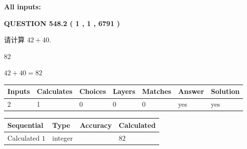 \documentclass{ctexart}
\begin{document}
   
   
   
\noindent{}
   
   
   
   
\noindent\vspace{0.1in}\hspace{-0.08in} {\textbf{\Large{All inputs: }}}
   
   
  
\vspace{0.2in}
  
{\textbf{\Large{QUESTION
548.2 
 ( 1 , 1 , 6791 )
}}}
  
  
 
请计算 $ %
42 +  %
40 $.
 
 
 
\noindent{}
 
 

82
 
 
\noindent{}
 
 

 
 
 
\noindent{}
 
 

$ %
42 +  %
40=   %
82$
 
 
\noindent{}
 
 

 
   
   
   
   
\noindent\begin{tabular}{|l|l|l|l|l|l|l|}
 \hline
Inputs & Calculates & Choices & Layers & Matches & Answer & Solution \\ \hline
 2  & 
 1  & 
 0
  & 
 0  & 
 0  & 
  yes & 
  yes 
  \\ \hline
 \end{tabular}
   
   
   
   
\noindent{}
   
   
  
  
\noindent\begin{tabular}{|l|l|l|l|}
\hline
 Sequential & Type & Accuracy & Calculated \\ 
\hline
 
 
  Calculated $  1 $ & integer &  & 
  $ 82 $ 
 \\  \hline  
 \end{tabular}
   
\end{document}
